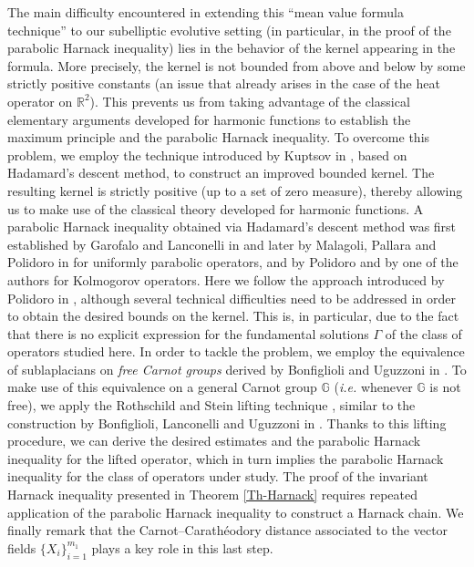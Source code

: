 \documentclass[11pt,a4paper]{article}
\numberwithin{equation}{section}
\newcommand{\R}{\mathbb{R}}
\def \GG {{\mathbb{G}}}
\begin{document}
The main difficulty encountered in extending this “mean value formula technique” to our subelliptic evolutive setting (in particular, in the proof of the parabolic Harnack inequality) lies in the behavior of the kernel appearing in the formula. More precisely, the kernel is not bounded from above and below by some strictly positive constants (an issue that already arises in the case of the heat operator on $\R^2$). This prevents us from taking advantage of the classical elementary arguments developed for harmonic functions to establish the maximum principle and the parabolic Harnack inequality. To overcome this problem, we employ the technique introduced by Kuptsov  in \cite{Kupcov}, based on Hadamard's descent method, to construct an improved bounded kernel. The resulting kernel is strictly positive (up to a set of zero measure), thereby allowing us to make use of the classical theory developed for harmonic functions. A parabolic Harnack inequality obtained via Hadamard’s descent method was first established by Garofalo and Lanconelli in \cite{GarofaloLanconelli-1989} and later by Malagoli, Pallara and Polidoro in \cite{malagoli} for uniformly parabolic operators, and by Polidoro \cite{polidoro-parametrix} and by one of the authors \cite{rebucci24} for Kolmogorov operators. Here we follow the approach introduced by Polidoro in \cite{polidoro-parametrix}, although several technical difficulties need to be addressed in order to obtain the desired bounds on the kernel. This is, in particular, due to the fact that there is no explicit expression for the fundamental solutions $\Gamma$ of the class of operators studied here. In order to tackle the problem, we employ the equivalence of sublaplacians on \emph{free Carnot groups} derived by Bonfiglioli and Uguzzoni in \cite{bonfiglioli2004families}. To make use of this equivalence on a general Carnot group $\GG$ (\emph{i.e.} whenever $\GG$ is not free), we apply the Rothschild and Stein lifting technique \cite{rothschild1976hypoelliptic}, similar to the construction by Bonfiglioli, Lanconelli and Uguzzoni in \cite{bonfiglioli2002uniform}. Thanks to this lifting procedure, we can derive the desired estimates and the parabolic Harnack inequality for the lifted operator, which in turn implies the parabolic Harnack inequality for the class of operators under study. The proof of the invariant Harnack inequality presented in Theorem \ref{Th-Harnack} requires repeated application of the parabolic Harnack inequality to construct a Harnack chain. We finally remark that the Carnot–Carathéodory distance associated to the vector fields $\{X_i\}_{i=1}^{m_1}$ plays a key role in this last step.
\end{document}

